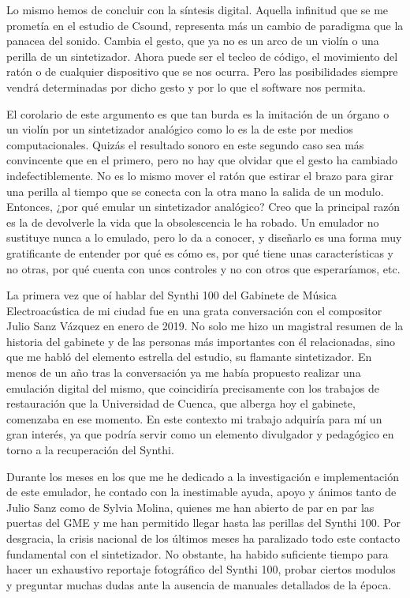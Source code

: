 Lo mismo hemos de concluir con la síntesis digital. Aquella infinitud que se me prometía en el estudio de Csound, representa más un cambio de paradigma que la panacea del sonido. Cambia el gesto, que ya no es un arco de un violín o una perilla de un sintetizador. Ahora puede ser el tecleo de código, el movimiento del ratón o de cualquier dispositivo que se nos ocurra. Pero las posibilidades siempre vendrá determinadas por dicho gesto y por lo que el software nos permita.

El corolario de este argumento es que tan burda es la imitación de un órgano o un violín por un sintetizador analógico como lo es la de este por medios computacionales. Quizás el resultado sonoro en este segundo caso sea más convincente que en el primero, pero no hay que olvidar que el gesto ha cambiado indefectiblemente. No es lo mismo mover el ratón que estirar el brazo para girar una perilla al tiempo que se conecta con la otra mano la salida de un modulo. Entonces, ¿por qué emular un sintetizador analógico? Creo que la principal razón es la de devolverle la vida que la obsolescencia le ha robado. Un emulador no sustituye nunca a lo emulado, pero lo da a conocer, y diseñarlo es una forma muy gratificante de entender por qué es cómo es, por qué tiene unas características y no otras, por qué cuenta con unos controles y no con otros que esperaríamos, etc. 

La primera vez que oí hablar del Synthi 100 del Gabinete de Música Electroacústica de mi ciudad fue en una grata conversación con el compositor Julio Sanz Vázquez en enero de 2019. No solo me hizo un magistral resumen de la historia del gabinete y de las personas más importantes con él relacionadas, sino que me habló del elemento estrella del estudio, su flamante sintetizador. En menos de un año tras la conversación ya me había propuesto realizar una emulación digital del mismo, que coincidiría precisamente con los trabajos de restauración que la Universidad de Cuenca, que alberga hoy el gabinete, comenzaba en ese momento. En este contexto mi trabajo adquiría para mí un gran interés, ya que podría servir como un elemento divulgador y pedagógico en torno a la recuperación del Synthi. 

Durante los meses en los que me he dedicado a la investigación e implementación de este emulador, he contado con la inestimable ayuda, apoyo y ánimos tanto de Julio Sanz como de Sylvia Molina, quienes me han abierto de par en par las puertas del GME y me han permitido llegar hasta las perillas del Synthi 100. Por desgracia, la crisis nacional de los últimos meses ha paralizado todo este contacto fundamental con el sintetizador. No obstante, ha habido suficiente tiempo para hacer un exhaustivo reportaje fotográfico del Synthi 100, probar ciertos modulos y preguntar muchas dudas ante la ausencia de manuales detallados de la época.


